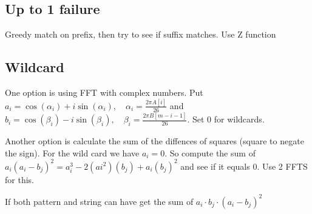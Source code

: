 \documentclass{article}
\begin{document}
\subsection{Up to 1 failure}
Greedy match on prefix, then try to see if suffix matches. Use Z function

\subsection{Wildcard}
One option is using FFT with complex numbers. Put $a_i = \cos(\alpha_i) + i \sin(\alpha_i), \quad \alpha_i = \frac{2 \pi A[i]}{26}$ and $b_i = \cos(\beta_i) - i \sin(\beta_i), \quad \beta_i = \frac{2 \pi B[m-i-1]}{26}$. Set 0 for wildcards.

Another option is calculate the sum of the diffences of squares (square to negate the sign). For the wild card we have $a_i = 0$. So compute the sum of $a_i (a_i - b_j)^2 = a_i^3 - 2(ai^2)(b_j) + a_i (b_j)^2$ and see if it equals 0. Use 2 FFTS for this. 

If both pattern and string can have get the sum of $a_i \cdot b_j \cdot (a_i - b_j)^2$
\end{document}
